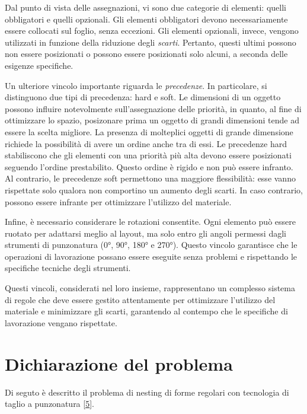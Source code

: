 Dal punto di vista delle assegnazioni, vi sono due categorie di elementi: quelli obbligatori e quelli opzionali. Gli elementi obbligatori devono necessariamente essere collocati sul foglio, senza eccezioni. Gli elementi opzionali, invece, vengono utilizzati in funzione della riduzione degli \emph{scarti}\glsfirstoccur. Pertanto, questi ultimi possono non essere posizionati o possono essere posizionati solo alcuni, a seconda delle esigenze specifiche.

Un ulteriore vincolo importante riguarda le \emph{precedenze}\glsfirstoccur. In particolare, si distinguono due tipi di precedenza: hard e soft. Le dimensioni di un oggetto possono influire notevolmente sull'assegnazione delle priorità, in quanto, al fine di ottimizzare lo spazio, posizonare prima un oggetto di grandi dimensioni tende ad essere la scelta migliore. La presenza di molteplici oggetti di grande dimensione richiede la possibilità di avere un ordine anche tra di essi. Le precedenze hard stabiliscono che gli elementi con una priorità più alta devono essere posizionati seguendo l'ordine prestabilito. Questo ordine è rigido e non può essere infranto. Al contrario, le precedenze soft permettono una maggiore flessibilità: esse vanno rispettate solo qualora non comportino un aumento degli scarti. In caso contrario, possono essere infrante per ottimizzare l’utilizzo del materiale.

Infine, è necessario considerare le rotazioni consentite. Ogni elemento può essere ruotato per adattarsi meglio al layout, ma solo entro gli angoli permessi dagli strumenti di punzonatura (0°, 90°, 180° e 270°). Questo vincolo garantisce che le operazioni di lavorazione possano essere eseguite senza problemi e rispettando le specifiche tecniche degli strumenti.

Questi vincoli, considerati nel loro insieme, rappresentano un complesso sistema di regole che deve essere gestito attentamente per ottimizzare l’utilizzo del materiale e minimizzare gli scarti, garantendo al contempo che le specifiche di lavorazione vengano rispettate.

\section{Dichiarazione del problema}

Di seguto è descritto il problema di nesting di forme regolari con tecnologia di taglio a punzonatura [\hyperlink{bibliografia}{5}].


